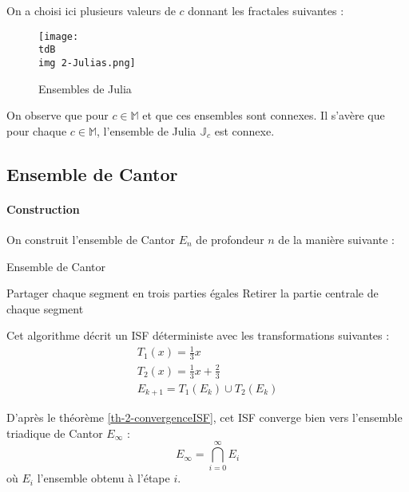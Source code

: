 		On a choisi ici plusieurs valeurs de $c$ donnant les fractales suivantes :
		\begin{figure}[H]
			\centering
			\texttt{[image: \\tdB\\img 2-Julias.png]}
			\caption{Ensembles de Julia}
			\label{img-2-julia}
		\end{figure}

		On observe que pour $c\in\mathbb{M}$ et que ces ensembles sont connexes.
		Il s'avère que pour chaque $c\in\mathbb{M}$, l'ensemble de Julia $\mathbb{J}_c$ est connexe.


	\subsection{Ensemble de Cantor}



		\paragraph{Construction}
			On construit l'ensemble de Cantor $E_n$ de profondeur $n$ de la manière suivante :

			\begin{algorithm}[H]
			\DontPrintSemicolon
			\caption{Ensemble de Cantor}
				{
					Partager chaque segment en trois parties égales\;
					Retirer la partie centrale de chaque segment\;
				}
			\end{algorithm}

			Cet algorithme décrit un ISF déterministe avec les transformations suivantes :
			\begin{align*}
				T_1(x) = \frac{1}{3}x				\\
				T_2(x) = \frac{1}{3}x + \frac{2}{3}	\\
				E_{k+1} = T_1(E_k) \cup T_2(E_k)
			\end{align*}

			D'après le théorème \eqref{th-2-convergenceISF}, cet ISF converge bien vers l'ensemble triadique de Cantor $E_\infty$ \tq:
			\begin{equation}
				\label{eq-2-cantor}
				E_\infty = \bigcap_{i=0}^{\infty} E_i
			\end{equation}
			où $E_i$ l'ensemble obtenu à l'étape $i$.

